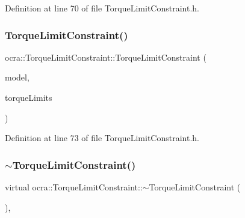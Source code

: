 Definition at line 70 of file Torque\+Limit\+Constraint.\+h.

\hypertarget{classocra_1_1TorqueLimitConstraint_adf43adabb40dc149d609b219fe8b7ac0}{}\label{classocra_1_1TorqueLimitConstraint_adf43adabb40dc149d609b219fe8b7ac0} 
\subsubsection{\texorpdfstring{Torque\+Limit\+Constraint()}{TorqueLimitConstraint()}\hspace{0.1cm}{\footnotesize\ttfamily [2/2]}}
{\footnotesize\ttfamily ocra\+::\+Torque\+Limit\+Constraint\+::\+Torque\+Limit\+Constraint (\begin{DoxyParamCaption}\item[{const \hyperlink{classocra_1_1Model}{Model} \&}]{model,  }\item[{const Eigen\+::\+Vector\+Xd \&}]{torque\+Limits }\end{DoxyParamCaption})\hspace{0.3cm}{\ttfamily [inline]}}



Definition at line 73 of file Torque\+Limit\+Constraint.\+h.

\hypertarget{classocra_1_1TorqueLimitConstraint_a893e34cf1ab2a6faf59bf394e769bbe3}{}\label{classocra_1_1TorqueLimitConstraint_a893e34cf1ab2a6faf59bf394e769bbe3} 
\subsubsection{\texorpdfstring{$\sim$\+Torque\+Limit\+Constraint()}{~TorqueLimitConstraint()}}
{\footnotesize\ttfamily virtual ocra\+::\+Torque\+Limit\+Constraint\+::$\sim$\+Torque\+Limit\+Constraint (\begin{DoxyParamCaption}{ }\end{DoxyParamCaption})\hspace{0.3cm}{\ttfamily [inline]}, {\ttfamily [virtual]}}



